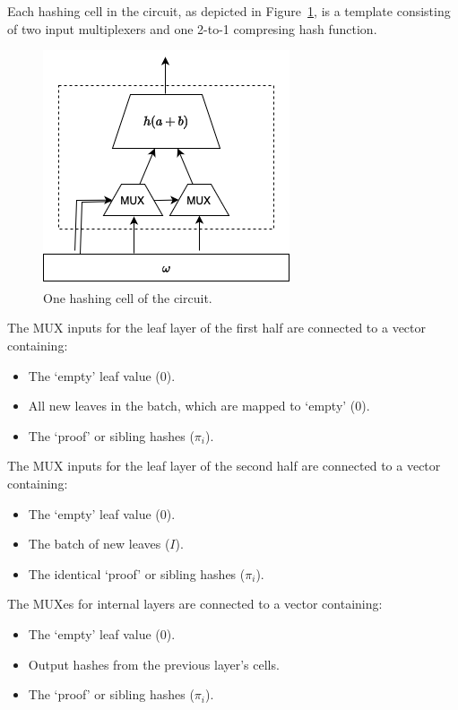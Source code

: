 \documentclass[twocolumn]{article}
\begin{document}
Each hashing cell in the circuit, as depicted in Figure~\ref{fi:smt-circuit-cell}, is a template consisting of two input multiplexers and one 2-to-1 compresing hash function.

\begin{figure}[t]
    \centering
    \includegraphics[width=.6\columnwidth]{pic/smt-circuit-cell.drawio}
    \caption{One hashing cell of the circuit.}\label{fi:smt-circuit-cell}
\end{figure}


The MUX inputs for the leaf layer of the first half are connected to a vector containing:
\begin{itemize}
    \item The `empty' leaf value ($0$).
    \item All new leaves in the batch, which are mapped to `empty' ($0$).
    \item The `proof' or sibling hashes ($\pi_i$).
\end{itemize}

The MUX inputs for the leaf layer of the second half are connected to a vector containing:
\begin{itemize}
    \item The `empty' leaf value ($0$).
    \item The batch of new leaves ($I$).
    \item The identical `proof' or sibling hashes ($\pi_i$).
\end{itemize}

The MUXes for internal layers are connected to a vector containing:
\begin{itemize}
    \item The `empty' leaf value ($0$).
    \item Output hashes from the previous layer's cells.
    \item The `proof' or sibling hashes ($\pi_i$).
\end{itemize}
\end{document}
